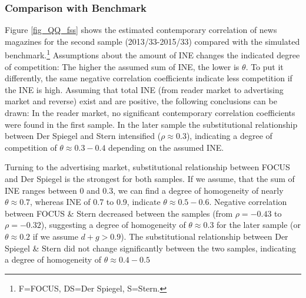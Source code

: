 \documentclass[12pt,a4paper,notitlepage]{article}
\begin{document}
\subsubsection{Comparison with Benchmark}

Figure \ref{fig_QQ_fss} shows the estimated contemporary correlation of news magazines for the second sample (2013/33-2015/33) compared with the simulated benchmark.\footnote{F=FOCUS, DS=Der Spiegel, S=Stern.} Assumptions about the amount of INE changes the indicated degree of competition: The higher the assumed sum of INE, the lower is $\theta$. To put it differently, the same negative correlation coefficients indicate less competition if the INE is high. Assuming that total INE (from reader market to advertising market and reverse) exist and are positive, the following conclusions can be drawn: In the reader market, no significant contemporary correlation coefficients were found in the first sample. In the later sample the substitutional relationship between Der Spiegel and Stern intensified ($\rho\approx0.3$), indicating a degree of competition of $\theta\approx0.3-0.4$ depending on the assumed INE.

Turning to the advertising market, substitutional relationship between FOCUS and Der Spiegel is the strongest for both samples. If we assume, that the sum of INE ranges between 0 and 0.3, we can find a degree of homogeneity of nearly $\theta\approx0.7$, whereas INE of 0.7 to 0.9, indicate $\theta\approx0.5-0.6$. Negative correlation between FOCUS \& Stern decreased between the samples (from $\rho=-0.43$ to $\rho=-0.32$), suggesting a degree of homogeneity of $\theta\approx0.3$ for the later sample (or $\theta\approx0.2$ if we assume $d+g>0.9$). The substitutional relationship between Der Spiegel \& Stern did not change significantly between the two samples, indicating a degree of homogeneity of $\theta\approx0.4-0.5$
\end{document}
